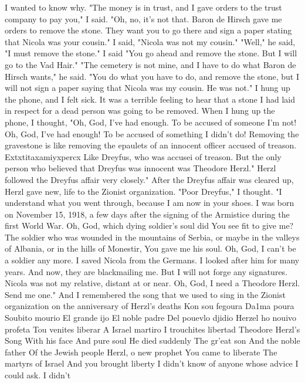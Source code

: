 I wanted to know why.
"The money is in trust, and I gave orders to the trust company 
to pay you," I said.
"Oh, no, it's not that.
Baron de Hirsch gave me orders to remove the stone.
They want you to go there and sign a paper stating 
that Nicola was your cousin."
I said, "Nicola was not my cousin."
"Well," he said, "I must remove the stone."
I said "You go ahead and remove the stone.
But I will go to 
the Vad Hair."
"The cemetery is not mine, and I have to do what Baron de Hirsch 
wants," he said.
"You do what you have to do, and remove the stone, but I will 
not sign a paper saying that Nicola was my cousin.
He was not."
I hung up the phone, and I felt sick.
It was a terrible feeling 
to hear that a stone I had laid in respect for a dead person was 
going to be removed.
When I hung up the phone, I thought, "Oh, God, I've had 
enough.
To be accused of someone I'm not!
Oh, God, I've had enough!
To be accused of something I didn't do!
Removing the 
gravestone is like removing the epaulets of an innocent officer 
accused of treason.
Extxtitaxamiyxpercx Like Dreyfus, who was accusei 
of treason.
But the only person who believed that Dreyfus was innocent was Theodore Herzl."
Herzl followed the Dreyfus affair very 
closely."
After the Dreyfus affair was cleared up, Herzl gave new, 
life to the Zionist organization.
"Poor Dreyfus," I thought.
"I 
understand what you went through, because I am now in your shoes.
I
was born on November 15, 1918, a few days after the signing of the 
Armistice during the first World War.
Oh, God, which dying soldier's 
soul did You see fit to give me?
The soldier who was wounded in the 
mountains of Serbia, or maybe in the valleys of Albania, or in the 
hills of Monestir, You gave me his soul.
Oh, God, I can't be a 
soldier any more.
I saved Nicola from the Germans.
I looked after 
him for many years.
And now, they are blackmailing me.
But I will 
not forge any signatures.
Nicola was not my relative, distant at 
or near.
Oh, God, I need a Theodore Herzl.
Send me one."
And I 
remembered the song that we used to sing in the Zionist organization on the anniversary of Herzl's deaths 
Kon sou fegoura 
Da1ma poura 
Soubito mourio 
El grande ijo 
El noble padre 
Del pouevlo djidio 
Herzel ho nouivo profeta 
Tou venites liberar 
A Israel martiro 
I trouchites libertad 
Theodore Herzl's Song 
With his face 
And pure soul 
He died suddenly 
The gr'eat son 
And the noble father 
Of the Jewish people 
Herzl, o new prophet 
You came to liberate 
The martyrs of Israel 
And you brought liberty 
I didn't know of anyone whose advice I could ask.
I didn't 
